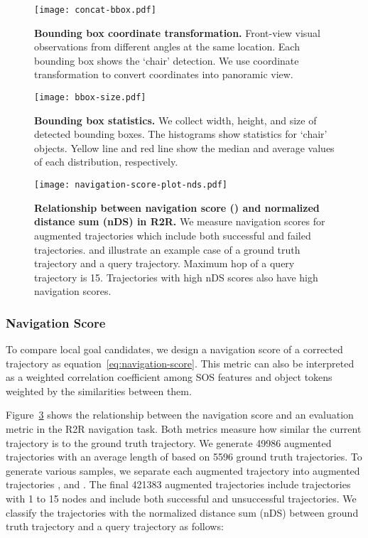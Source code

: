 \documentclass[10pt,twocolumn,letterpaper]{article}
\begin{document}
\begin{figure}[t!]{\centering\texttt{[image: concat-bbox.pdf]}}\centering
\caption{{\textbf{Bounding box coordinate transformation.} Front-view visual observations from different angles at the same location. Each bounding box shows the `chair' detection. We use coordinate transformation to convert coordinates into panoramic view.
}}\label{fig:bbox-coordinate-transformation}
\end{figure}
\begin{figure}[t!]{\centering\texttt{[image: bbox-size.pdf]}}\centering
\caption{{\textbf{Bounding box statistics.} We collect width, height, and size of detected bounding boxes. The histograms show statistics for `chair' objects. Yellow line and red line show the median and average values of each distribution, respectively.
}}\label{fig:bbox-size} \vspace{-0.2cm}
\end{figure}
\begin{figure}[t!]{\centering\texttt{[image: navigation-score-plot-nds.pdf]}}\centering
\caption{{\textbf{Relationship between navigation score () and normalized distance sum (nDS) in R2R.} We measure navigation scores for augmented trajectories which include both successful and failed trajectories.  and  illustrate an example case of a ground truth trajectory and a query trajectory. Maximum hop of a query trajectory is 15. Trajectories with high nDS scores also have high navigation scores.
}}\label{fig:navigation-score-plot} 
\end{figure}

\vspace{-0.4cm}
\subsubsection{Navigation Score}
To compare local goal candidates, we design a navigation score of a corrected trajectory  as equation~\ref{eq:navigation-score}. This metric can also be interpreted as a weighted correlation coefficient among SOS features and object tokens weighted by the similarities between them.

{\footnotesize

}

\renewcommand{\baselinestretch}{1.5}
Figure~\ref{fig:navigation-score-plot} shows the relationship between the navigation score and an evaluation metric in the R2R navigation task. Both metrics measure how similar the current trajectory is to the ground truth trajectory. We generate \num[group-separator={,}]{49986} augmented trajectories with an average length of  based on \num[group-separator={,}]{5596} ground truth trajectories. To generate various samples, we separate each augmented trajectory  into  augmented trajectories , and . The final \num[group-separator={,}]{421383} augmented trajectories include trajectories with 1 to 15 nodes and include both successful and unsuccessful trajectories. We classify the trajectories with the normalized distance sum (nDS) between ground truth trajectory  and a query trajectory  as follows:
{\scriptsize	

}
\renewcommand{\baselinestretch}{1}
\end{document}
